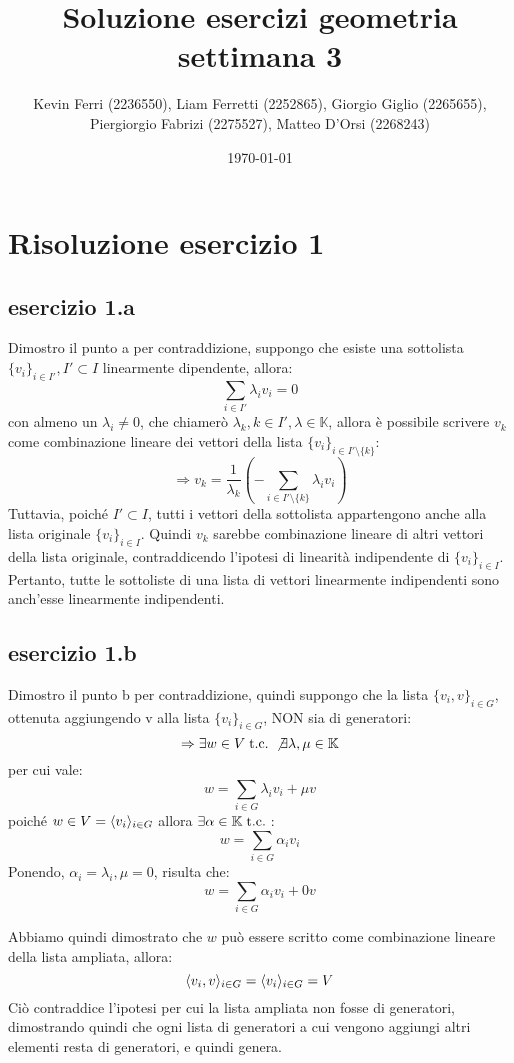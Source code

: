 \documentclass[a4paper,12pt]{article}
\title{\textbf{Soluzione esercizi geometria settimana 3}}
\author{Kevin Ferri (2236550), Liam Ferretti (2252865), Giorgio Giglio (2265655), Piergiorgio Fabrizi (2275527), Matteo D'Orsi (2268243)}
\date{\today}
\begin{document}
	
	\maketitle
		
	\newpage
	\tableofcontents
	\clearpage
	\section{Risoluzione esercizio 1}
	\subsection{esercizio 1.a}
	Dimostro il punto a per contraddizione, suppongo che esiste una sottolista $\{v_i\}_{i \in I'}, I' \subset I$ linearmente dipendente, allora:
		\[\sum_{i \in I'} \lambda_i v_i = 0\]
	con almeno un $\lambda_i \not = 0$, che chiamerò $\lambda_k, k \in I', \lambda \in \mathbb{K}$, allora è possibile scrivere $v_k$ come combinazione lineare dei vettori della lista $\{v_i\}_{i \in I'\setminus\{k\}}$:
	\[\Rightarrow v_k = \frac{1}{\lambda_k}(-\sum_{i \in I'\setminus\{k\}}\lambda_i v_i)\]
	Tuttavia, poiché $I' \subset I$, tutti i vettori della sottolista appartengono anche alla lista originale $\{v_i\}_{i \in I}$. Quindi $v_k$ sarebbe combinazione lineare di altri vettori della lista originale, contraddicendo l’ipotesi di linearità indipendente di $\{v_i\}_{i \in I}$.
	Pertanto, tutte le sottoliste di una lista di vettori linearmente indipendenti sono anch’esse linearmente indipendenti.
	
	\subsection{esercizio 1.b}
	Dimostro il punto b per contraddizione, quindi suppongo che la lista $\{v_i, v\}_{i \in G}$, ottenuta aggiungendo v alla lista $\{v_i\}_{i \in G}$, NON sia di generatori:
	\[\Rightarrow \exists w \in V \;\text{t.c.}\; \not \exists \lambda, \mu \in \mathbb{K}\]
	per cui vale:
	\[w = \sum_{i \in G} \lambda_i v_i + \mu v\]
	poiché $w \in V = \langle v_i \rangle_{i \in G}$ allora $\exists \alpha \in \mathbb{K} 
	\;\text{t.c.}\;$:
	\[w = \sum_{i \in G} \alpha_i v_i\]
	Ponendo, $\alpha_i = \lambda_i, \mu = 0$, risulta che:
	\[w = \sum_{i \in G} \alpha_i v_i + 0v\]
	
	Abbiamo quindi dimostrato che $w$ può essere scritto come combinazione lineare della lista ampliata, allora:
	\[\langle v_i, v \rangle_{i \in G} = \langle v_i \rangle_{i \in G} = V\]
	Ciò contraddice l'ipotesi per cui la lista ampliata non fosse di generatori, dimostrando quindi che ogni lista di generatori a cui vengono aggiungi altri elementi resta di generatori, e quindi genera.
	
\end{document}
